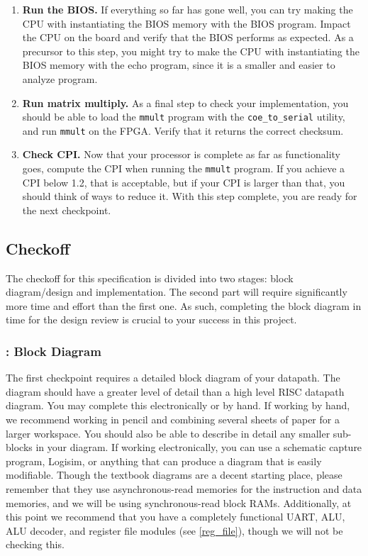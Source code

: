 \documentclass[11pt]{article}
\begin{document}
\begin{enumerate}
	\item \textbf{Run the BIOS.} If everything so far has gone well, you can try making the CPU with instantiating the BIOS memory with the BIOS program. Impact the CPU on the board and verify that the BIOS performs as expected. As a precursor to this step, you might try to make the CPU with instantiating the BIOS memory with the echo program, since it is a smaller and easier to analyze program.
	
	\item \textbf{Run matrix multiply.} As a final step to check your implementation, you should be able to load the \verb|mmult| program with the \verb|coe_to_serial| utility, and run \verb|mmult| on the FPGA. Verify that it returns the correct checksum.
	
	\item \textbf{Check CPI.} Now that your processor is complete as far as functionality goes, compute the CPI when running the \verb|mmult| program. If you achieve a CPI below 1.2, that is acceptable, but if your CPI is larger than that, you should think of ways to reduce it. With this step complete, you are ready for the next checkpoint.
\end{enumerate}

\subsection{Checkoff}

The checkoff for this specification is divided into two stages: block diagram/design and implementation. The second part will require significantly more time and effort than the first one. As such, completing the block diagram in time for the design review is crucial to your success in this project.

\subsubsection{\blockDiagramTaskName: Block Diagram}
The first checkpoint requires a detailed block diagram of your datapath. The diagram should have a greater level of detail than a high level RISC datapath diagram. You may complete this electronically or by hand. If working by hand, we recommend working in pencil and combining several sheets of paper for a larger workspace. You should also be able to describe in detail any smaller sub-blocks in your diagram. If working electronically, you can use a schematic capture program, Logisim, or anything that can produce a diagram that is easily modifiable. Though the textbook diagrams are a decent starting place, please remember that they use asynchronous-read memories for the instruction and data memories, and we will be using synchronous-read block RAMs. Additionally, at this point we recommend that you have a completely functional UART, ALU, ALU decoder, and register file modules (see \ref{reg_file}), though we will not be checking this.
\end{document}
